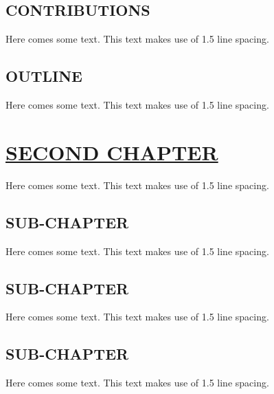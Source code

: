 \documentclass[fontsize=13pt]{scrartcl}
\begin{document}
{{{{{{{\subsection{CONTRIBUTIONS}
Here comes some text. This text makes use of 1.5 line spacing. 
\subsection{OUTLINE}
Here comes some text. This text makes use of 1.5 line spacing. 
\pagebreak
\section{\uline{SECOND CHAPTER}}
Here comes some text. This text makes use of 1.5 line spacing. 
\subsection{SUB-CHAPTER}
Here comes some text. This text makes use of 1.5 line spacing. 
\subsection{SUB-CHAPTER}
Here comes some text. This text makes use of 1.5 line spacing. 
\subsection{SUB-CHAPTER}
Here comes some text. This text makes use of 1.5 line spacing. 
\pagebreak
}}}}}}}
\end{document}
